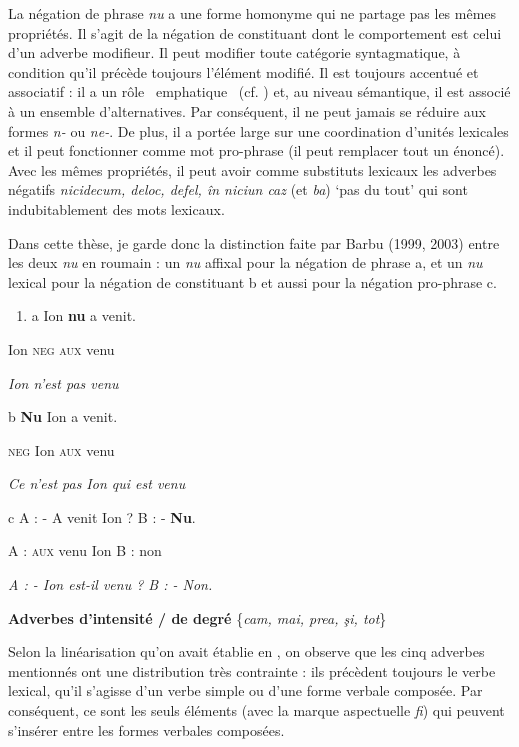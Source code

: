 La négation de phrase \textit{nu} a une forme homonyme qui ne partage pas les mêmes propriétés. Il s'agit de la négation de constituant dont le comportement est celui d'un adverbe modifieur. Il peut modifier toute catégorie syntagmatique, à condition qu'il précède toujours l'élément modifié. Il est toujours accentué et associatif : il a un rôle {\guillemotleft}~emphatique~{\guillemotright} (cf. \citet{Barbu2003}) et, au niveau sémantique, il est associé à un ensemble d'alternatives. Par conséquent, il ne peut jamais se réduire aux formes \textit{n-} ou \textit{ne-}. De plus, il a portée large sur une coordination d'unités lexicales et il peut fonctionner comme mot pro-phrase (il peut remplacer tout un énoncé). Avec les mêmes propriétés, il peut avoir comme substituts lexicaux les adverbes négatifs \textit{nicidecum, deloc, defel, în niciun caz} (et \textit{ba}) `pas du tout' qui sont indubitablement des mots lexicaux.  

Dans cette thèse, je garde donc la distinction faite par Barbu (1999, 2003) entre les deux \textit{nu} en roumain : un \textit{nu} affixal pour la négation de phrase a, et un \textit{nu} lexical pour la négation de constituant b et aussi pour la négation pro-phrase c. 


\begin{enumerate}
\item \label{bkm:Ref299297299}a  Ion  \textbf{nu}  a  venit. 


\end{enumerate}
Ion  \textsc{neg}  \textsc{aux}  venu 

{\itshape
Ion n'est pas venu}

b  \textbf{Nu}  Ion  a  venit.

  \textsc{neg } Ion  \textsc{aux}  venu

  \textit{Ce n'est pas Ion qui est venu} 

c  A : - A  venit  Ion ? B : - \textbf{Nu}.

  A : \textsc{aux}  venu  Ion  B : non

{\itshape
A : - Ion est-il venu ? B : - Non.}

\textbf{Adverbes d'intensité / de degré} \{\textit{cam, mai, prea, şi, tot}\}

Selon la linéarisation qu'on avait établie en , on observe que les cinq adverbes mentionnés ont une distribution très contrainte : ils précèdent toujours le verbe lexical, qu'il s'agisse d'un verbe simple ou d'une forme verbale composée. Par conséquent, ce sont les seuls éléments (avec la marque aspectuelle \textit{fi}) qui peuvent s'insérer entre les formes verbales composées.

